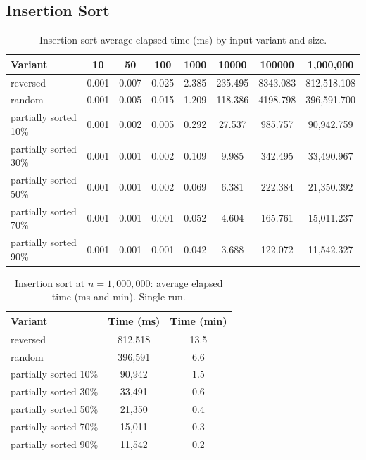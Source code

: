 \documentclass[11pt,a4paper]{article}
\begin{document}
\subsection{Insertion Sort}
\begin{table}[H]
\centering
\footnotesize
\begin{tabular}{lccccccc}
\toprule
Variant & 10 & 50 & 100 & 1000 & 10000 & 100000 & 1{,}000{,}000 \\
\midrule
reversed & 0.001 & 0.007 & 0.025 & 2.385 & 235.495 & 8343.083 & 812{,}518.108 \\
random & 0.001 & 0.005 & 0.015 & 1.209 & 118.386 & 4198.798 & 396{,}591.700 \\
partially sorted 10\% & 0.001 & 0.002 & 0.005 & 0.292 & 27.537 & 985.757 & 90{,}942.759 \\
partially sorted 30\% & 0.001 & 0.001 & 0.002 & 0.109 & 9.985 & 342.495 & 33{,}490.967 \\
partially sorted 50\% & 0.001 & 0.001 & 0.002 & 0.069 & 6.381 & 222.384 & 21{,}350.392 \\
partially sorted 70\% & 0.001 & 0.001 & 0.001 & 0.052 & 4.604 & 165.761 & 15{,}011.237 \\
partially sorted 90\% & 0.001 & 0.001 & 0.001 & 0.042 & 3.688 & 122.072 & 11{,}542.327 \\
\bottomrule
\end{tabular}
\caption{Insertion sort average elapsed time (ms) by input variant and size.}
\label{tab:insertion-results}
\end{table}

\begin{table}[H]
\centering
\begin{tabular}{lcc}
\toprule
Variant & Time (ms) & Time (min) \\
\midrule
reversed & 812{,}518 & 13.5 \\
random & 396{,}591 & 6.6 \\
partially sorted 10\% & 90{,}942 & 1.5 \\
partially sorted 30\% & 33{,}491 & 0.6 \\
partially sorted 50\% & 21{,}350 & 0.4 \\
partially sorted 70\% & 15{,}011 & 0.3 \\
partially sorted 90\% & 11{,}542 & 0.2 \\
\bottomrule
\end{tabular}
\caption{Insertion sort at \(n=1{,}000{,}000\): average elapsed time (ms and min). Single run.}
\label{tab:insertion-1m}
\end{table}
\end{document}

